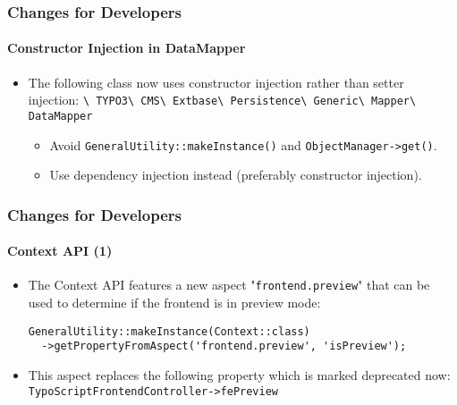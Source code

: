 \begin{frame}[fragile]
	\frametitle{Changes for Developers}
	\framesubtitle{Constructor Injection in DataMapper}

	\begin{itemize}

		\item The following class now uses constructor injection rather than setter injection:
			\smaller
				\texttt{\textbackslash
					TYPO3\textbackslash
					CMS\textbackslash
					Extbase\textbackslash
					Persistence\textbackslash
					Generic\textbackslash
					Mapper\textbackslash
					DataMapper}
			\normalsize

			\begin{itemize}\smaller
				\item[\ding{228}] Avoid \texttt{GeneralUtility::makeInstance()} and \texttt{ObjectManager->get()}.
				\item[\ding{228}] Use dependency injection instead (preferably constructor injection).
			\end{itemize}\normalsize

	\end{itemize}

\end{frame}


\begin{frame}[fragile]
	\frametitle{Changes for Developers}
	\framesubtitle{Context API (1)}

	\lstset{basicstyle=\tiny\ttfamily}

	\begin{itemize}

		\item The Context API features a new aspect "\texttt{frontend.preview}"
			that can be used to determine if the frontend is in preview mode:

\begin{lstlisting}
GeneralUtility::makeInstance(Context::class)
  ->getPropertyFromAspect('frontend.preview', 'isPreview');
\end{lstlisting}

		\item This aspect replaces the following property which is marked deprecated now:
			\small\texttt{TypoScriptFrontendController->fePreview}\normalsize

	\end{itemize}

\end{frame}

